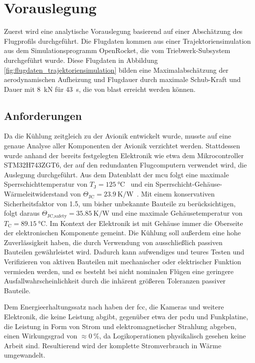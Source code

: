 \chapter{Vorauslegung}
\label{chap:Vorauslegung}

Zuerst wird eine analytische Vorauslegung basierend auf einer Abschätzung des Flugprofils durchgeführt.
Die Flugdaten kommen aus einer Trajektoriensimulation aus dem Simulationsprogramm OpenRocket, die vom Triebwerk-Subsystem durchgeführt wurde.
Diese Flugdaten in Abbildung \ref{fig:flugdaten_trajektoriensimulation} bilden eine Maximalabschätzung der aerodynamischen Aufheizung und Flugdauer durch
maximale Schub-Kraft und Dauer mit \SI{8}{\kilo\newton} für \SI{43}{\second}, die von \ac{blast} erreicht werden können.

\section{Anforderungen}

Da die Kühlung zeitgleich zu der Avionik entwickelt wurde, musste auf eine genaue Analyse aller Komponenten der Avionik verzichtet werden.
Stattdessen wurde anhand der bereits festgelegten Elektronik wie etwa dem Mikrocontroller STM32H743ZGT6, der auf den redundanten Flugcomputern verwendet wird,
die Auslegung durchgeführt.
Aus dem Datenblatt der \ac{mcu} folgt eine maximale Sperrschichttemperatur von $T_\text{J} = \SI{125}{\degreeCelsius}$~\cite{STM32}
und ein Sperrschicht-Gehäuse-Wärmeleitwiderstand von $\Theta_\text{JC} = \SI{23,9}{\kelvin\per\watt}$~\cite{STM32}. Mit einem konservativen
Sicherheitsfaktor von 1.5, um bisher unbekannte Bauteile zu berücksichtigen, folgt daraus $\Theta_\text{JC,safety} = \SI{35,85}{\kelvin\per\watt}$
und eine maximale Gehäusetemperatur von $T_\text{C} = \SI{89,15}{\degreeCelsius}$. Im Kontext der Elektronik ist mit Gehäuse immer die
Oberseite der elektronischen Komponente gemeint.
Die Kühlung soll außerdem eine hohe Zuverlässigkeit haben, die durch Verwendung von ausschließlich passiven Bauteilen gewährleistet wird.
Dadurch kann aufwendiges und teures Testen und Verifizieren von aktiven Bauteilen mit mechanischer oder elektrischer Funktion vermieden werden, und es besteht bei
nicht nominalen Flügen eine geringere Ausfallwahrscheinlichkeit durch die inhärent größeren Toleranzen passiver Bauteile.

Dem Energieerhaltungssatz nach haben der \ac{fcc}, die Kameras und weitere Elektronik, die keine Leistung abgibt, gegenüber etwa
der \ac{pcdu} und Funkplatine, die Leistung in Form von Strom und elektromagnetischer Strahlung abgeben, einen Wirkungsgrad von
$\approx\SI{0}{\percent}$, da Logikoperationen physikalisch gesehen keine Arbeit sind. Resultierend wird der komplette Stromverbrauch
in Wärme umgewandelt.


